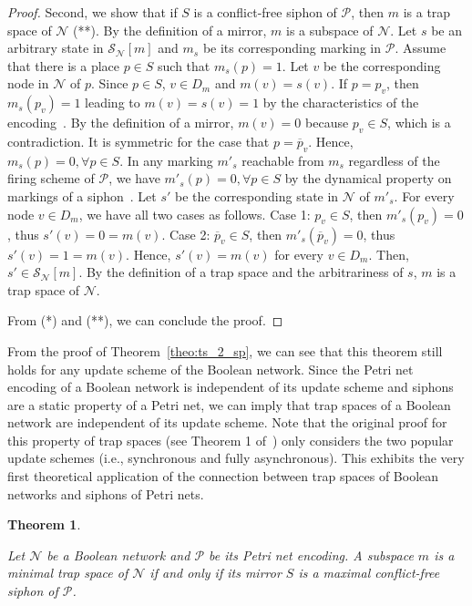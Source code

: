 \documentclass[preprint,12pt]{elsarticle}
\newtheorem{theorem}{Theorem}[section]
\begin{document}
\begin{proof}
  Second, we show that if \(S\) is a conflict-free siphon of \(\mathcal{P}\), then \(m\) is a trap space of \(\mathcal{N}\) (**).
  By the definition of a mirror, \(m\) is a subspace of \(\mathcal{N}\).
  Let \(s\) be an arbitrary state in \(\mathcal{S}_{\mathcal{N}}[m]\) and \(m_s\) be its corresponding marking in \(\mathcal{P}\).
  Assume that there is a place \(p \in S\) such that \(m_s(p) = 1\).
  Let \(v\) be the corresponding node in \(\mathcal{N}\) of \(p\).
  Since \(p \in S\), \(v \in D_m\) and \(m(v) = s(v)\).
  If \(p = p_{v}\), then \(m_s(p_{v}) = 1\) leading to \(m(v) = s(v) = 1\) by the characteristics of the encoding~\cite{chaouiya2004qualitative}.
  By the definition of a mirror, \(m(v) = 0\) because \(p_{v} \in S\), which is a contradiction.
  It is symmetric for the case that \(p = \overline{p}_{v}\).
  Hence, \(m_s(p) = 0, \forall p \in S\).
  In any marking \(m'_s\) reachable from \(m_s\) regardless of the firing scheme of \(\mathcal{P}\), we have \(m'_s(p) = 0, \forall p \in S\) by the dynamical property on markings of a siphon~\cite{DBLP:journals/isci/LiuB16}.
  Let \(s'\) be the corresponding state in \(\mathcal{N}\) of \(m'_s\).
  For every node \(v \in D_m\), we have all two cases as follows.
  Case 1: \(p_v \in S\), then \(m'_s(p_v) = 0\), thus \(s'(v) = 0 = m(v)\).
  Case 2: \(\overline{p}_v \in S\), then \(m'_s(\overline{p}_v) = 0\), thus \(s'(v) = 1 = m(v)\).
  Hence, \(s'(v) = m(v)\) for every \(v \in D_m\).
  Then, \(s' \in \mathcal{S}_{\mathcal{N}}[m]\).
  By the definition of a trap space and the arbitrariness of \(s\), \(m\) is a trap space of \(\mathcal{N}\).

  From (*) and (**), we can conclude the proof.
\end{proof}

From the proof of Theorem~\ref{theo:ts_2_sp}, we can see that this theorem still holds for any update scheme of the Boolean network.
Since the Petri net encoding of a Boolean network is independent of its update scheme and siphons are a static property of a Petri net, we can imply that trap spaces of a Boolean network are independent of its update scheme.
Note that the original proof for this property of trap spaces (see Theorem 1 of~\cite{klarner2015computing}) only considers the two popular update schemes (i.e., synchronous and fully asynchronous).
This exhibits the very first theoretical application of the connection between trap spaces of Boolean networks and siphons of Petri nets.

\begin{theorem}%
\label{theo:min_ts_2_max_sp}

  Let \(\mathcal{N}\) be a Boolean network and \(\mathcal{P}\) be its Petri net encoding. A subspace \(m\) is a minimal trap space of \(\mathcal{N}\) if and only if its mirror \(S\) is a maximal conflict-free siphon of \(\mathcal{P}\).

\end{theorem}
\end{document}
